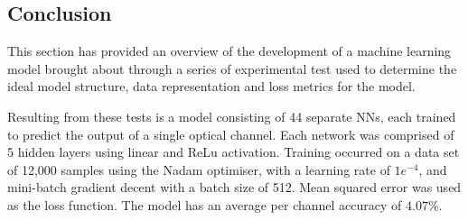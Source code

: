 \FloatBarrier


\subsection{Conclusion}

This section has provided an overview of the development of a machine learning model brought about through a series of experimental test used to determine the ideal model structure, data representation and loss metrics for the model.

Resulting from these tests is a model consisting of 44 separate NNs, each trained to predict the output of a single optical channel. Each network was comprised of 5 hidden layers using linear and ReLu activation. Training occurred on a data set of 12,000 samples using the Nadam optimiser, with a learning rate of $1e^{-4}$, and mini-batch gradient decent with a batch size of 512. Mean squared error was used as the loss function. The model has an average per channel accuracy of $4.07\%$. 


 